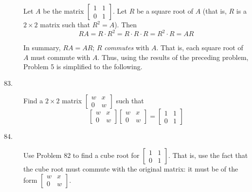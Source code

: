 \documentclass{article}
\begin{document}
\begin{description}
  \item[] Let $A$ be the matrix $\begin{bmatrix} 1 & 1 \\ 0 & 1 \end{bmatrix}$. Let $R$ be a square root of $A$ (that is, $R$ is a $2 \times 2$ matrix such that $R^2 = A$). Then
    \begin{equation*}
    RA = R \cdot R^2 = R \cdot R \cdot R = R^2 \cdot R = AR
    \end{equation*}

  \item[] In summary, $RA = AR$; $R$ \emph{commutes} with $A$. That is, each square root of $A$ must commute with $A$. Thus, using the results of the preceding problem, Problem 5 is simplified to the following.

  \item[83.] Find a $2 \times 2$ matrix $\begin{bmatrix} w & x \\ 0 & w \end{bmatrix}$ such that
    \begin{equation*}
    \begin{bmatrix} w & x \\ 0 & w \end{bmatrix} \begin{bmatrix} w & x \\ 0 & w \end{bmatrix}
    = \begin{bmatrix} 1 & 1 \\ 0 & 1 \end{bmatrix}
    \end{equation*}

  \item[84.] Use Problem 82 to find a cube root for $\begin{bmatrix} 1 & 1 \\ 0 & 1 \end{bmatrix}$. That is, use the fact that the cube root must commute with the original matrix: it must be of the form $\begin{bmatrix} w & x \\ 0 & w \end{bmatrix}$.


\end{description}
\end{document}

